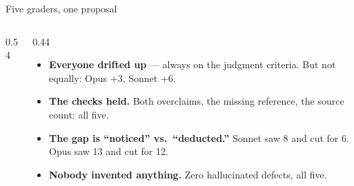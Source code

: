 \documentclass[aspectratio=169, 10pt]{beamer}
\begin{document}
\begin{frame}{Five graders, one proposal}
\begin{columns}[T]
\begin{column}{0.54\textwidth}
\end{column}
\begin{column}{0.44\textwidth}
\begin{tcolorbox}[keybox, title={\faSearch\quad What happened}, top=2pt, bottom=2pt]
\small
\begin{itemize}\setlength{\itemsep}{3pt}
  \item \textbf{Everyone drifted up} --- always on the judgment criteria. But not equally: Opus $+3$, Sonnet $+6$.
  \item \textbf{The checks held.} Both overclaims, the missing reference, the source count: all five.
  \item \textbf{The gap is ``noticed'' vs.\ ``deducted.''} Sonnet saw 8 and cut for 6. Opus saw 13 and cut for 12.
  \item \textbf{Nobody invented anything.} Zero hallucinated defects, all five.
\end{itemize}
\end{tcolorbox}
\end{column}
\end{columns}
\end{frame}

\fi
\end{document}
